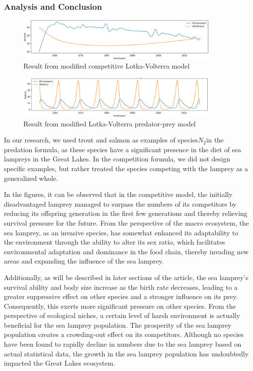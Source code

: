 \documentclass[12pt]{article}
\begin{document}
\subsubsection{Analysis and Conclusion}
\begin{figure}[h]
	\centering
	\includegraphics[width=0.9\textwidth]{Q1_LVComp.png}
	\caption{Result from modified competitive Lotka-Volterra model}
\end{figure}
\begin{figure}[h]
	\centering
	\includegraphics[width=0.9\textwidth]{Q1_LVPP.png}
	\caption{Result from modified Lotka-Volterra predator-prey model}
\end{figure}

In our research, we used trout and salmon as examples of species$N_2$in the predation
formula, as these species have a significant presence in the diet of sea lampreys in the Great Lakes.
In the competition formula, we did not design specific examples, but rather treated the species
competing with the lamprey as a generalized whole.

In the figures, it can be observed that in the competitive model, the initially disadvantaged
lamprey managed to surpass the numbers of its competitors by reducing its offspring generation
in the first few generations and thereby relieving survival pressure for the future. From the
perspective of the macro ecosystem, the sea lamprey, as an invasive species, has somewhat
enhanced its adaptability to the environment through the ability to alter its sex ratio,
which facilitates environmental adaptation and dominance in the food chain, thereby invading
new areas and expanding the influence of the sea lamprey.

Additionally, as will be described in later sections of the article, the sea lamprey's survival
ability and body size increase as the birth rate decreases, leading to a greater suppressive
effect on other species and a stronger influence on its prey. Consequently, this exerts more
significant pressure on other species. From the perspective of ecological niches, a certain
level of harsh environment is actually beneficial for the sea lamprey population. The prosperity
of the sea lamprey population creates a crowding-out effect on its competitors.
Although no species have been found to rapidly decline in numbers due to the sea
lamprey based on actual statistical data, the growth in the sea lamprey population has undoubtedly
impacted the Great Lakes ecosystem.
\end{document}
